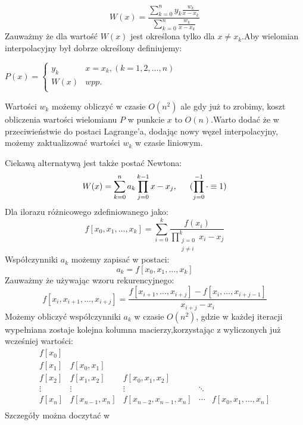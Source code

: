 \documentclass[11pt,wide]{article}
\begin{document}
\begin{equation}
W(x)=\frac{\displaystyle\sum_{k=0}^n y_k\frac{w_k}{x-x_k}}{\displaystyle\sum_{k=0}^n \frac{w_k}{x-x_k}}
\end{equation}
Zauważmy że dla wartość $W(x)$ jest określona tylko dla $x \neq x_k$.Aby wielomian interpolacyjny był dobrze określony definiujemy:
\begin{center}
$P(x) = \begin{cases}
y_k & x = x_k , (k = 1,2,\ldots,n)\\
W(x) & wpp.\\
\end{cases}$
\end{center}
Wartości $w_k$ możemy obliczyć w czasie $O(n^2)$ ale gdy już to zrobimy, koszt obliczenia wartości wielomianu $P$ w punkcie $x$ to $O(n)$.Warto dodać że w przeciwieństwie do postaci Lagrange'a, dodając nowy węzeł interpolacyjny, możemy zaktualizować wartości $w_k$ w czasie liniowym.\newline

\noindent Ciekawą alternatywą jest  także postać Newtona:
\begin{equation}
W(x) = \displaystyle\sum_{k=0}^n a_k\displaystyle\prod_{j=0}^{k-1}x-x_j,\indent (\displaystyle\prod_{j=0}^{-1}\cdot \equiv 1)
\end{equation}
Dla ilorazu różnicowego zdefiniowanego jako:
\begin{equation}
f[x_0, x_1, \ldots, x_k] = \displaystyle\sum_{i=0}^k \frac{f(x_i)}{\displaystyle\prod_{\substack{j = 0\\j \neq i}}^k x_i - x_j}
\end{equation}
Współczynniki $a_k$ możemy zapisać w postaci:
\begin{equation}
a_k = f[x_0,x_1,\ldots,x_k]
\end{equation}
\noindent Zauważmy że używając wzoru rekurencyjnego:
\begin{equation}
f[x_i,x_{i+1},\ldots,x_{i+j}] = \frac{f[x_{i+1},\ldots,x_{i+j}] - f[x_i,\ldots,x_{i+j-1}]}{x_{i+j} - x_i}
\end{equation}
Możemy obliczyć współczynniki $a_k$ w czasie $O(n^2)$, gdzie w każdej iteracji wypełniana zostaje kolejna kolumna macierzy,korzystając z wyliczonych już wcześniej wartości:
\[
 \begin{matrix}
  f[x_0] &  &  \\
  f[x_1] & f[x_0,x_1] &  \\
  f[x_2] & f[x_1,x_2] & f[x_0,x_1,x_2] \\
  \vdots & \vdots & \vdots & \ddots\\
  f[x_n] & f[x_{n-1},x_n] & f[x_{n-2},x_{n-1},x_{n}] & \cdots & f[x_0,x_1,\ldots,x_n] \\
 \end{matrix}
\]
\noindent
Szczegóły można doczytać w \cite[s.312]{kincaid}
\end{document}
